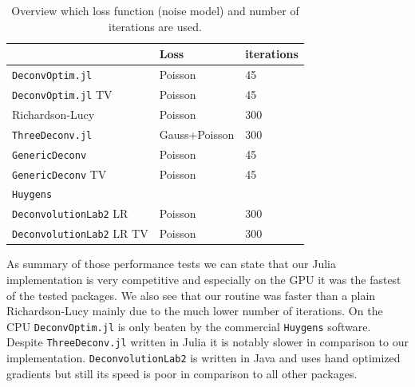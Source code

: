 \documentclass{juliacon}
\begin{document}
        \begin{table}[h]
            \begin{tabular}{l l l}
                & Loss & iterations \\ 
            \hline
            \verb|DeconvOptim.jl| & Poisson & 45 \\
            \verb|DeconvOptim.jl| TV & Poisson & 45\\
            Richardson-Lucy & Poisson & 300 \\
            \verb|ThreeDeconv.jl|  & Gauss+Poisson& 300\\
            \verb|GenericDeconv|  & Poisson & 45\\
            \verb|GenericDeconv| TV & Poisson & 45 \\
            \verb|Huygens| & & \\
            \verb|DeconvolutionLab2| LR & Poisson & 300\\
            \verb|DeconvolutionLab2| LR TV& Poisson & 300 
            \end{tabular}
            \caption{Overview which loss function (noise model) and number of iterations are used.}
            \label{tab:deconvprop}
        \end{table}
        As summary of those performance tests we can state that our Julia implementation is very competitive and especially on the GPU
        it was the fastest of the tested packages. 
        We also see that our routine was faster than a plain Richardson-Lucy mainly due to the much lower number
        of iterations.
        On the CPU \verb|DeconvOptim.jl| is only beaten by the commercial \verb|Huygens| software. 
        Despite \verb|ThreeDeconv.jl| written in Julia it is notably slower in comparison to our implementation.
        \verb|DeconvolutionLab2| is written in Java and uses hand optimized gradients but still its speed is poor in
        comparison to all other packages.
\end{document}
